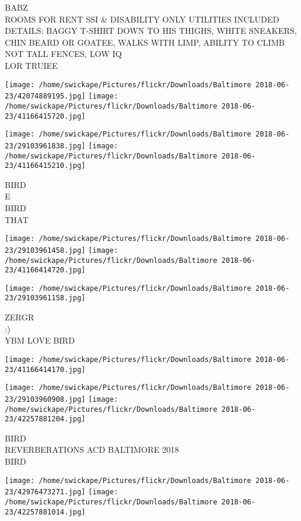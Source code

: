 \documentclass[10pt,letterpaper]{article}
\begin{document}
BABZ\\
ROOMS FOR RENT SSI \& DISABILITY ONLY UTILITIES INCLUDED\\
DETAILS: BAGGY T{-}SHIRT DOWN TO HIS THIGHS, WHITE SNEAKERS, CHIN BEARD OR GOATEE, WALKS WITH LIMP, ABILITY TO CLIMB NOT TALL FENCES, LOW IQ\\
LOR TRUIEE\\
\pagebreak

\texttt{[image: /home/swickape/Pictures/flickr/Downloads/Baltimore 2018-06-23/42074889195.jpg]}
\texttt{[image: /home/swickape/Pictures/flickr/Downloads/Baltimore 2018-06-23/41166415720.jpg]}

\texttt{[image: /home/swickape/Pictures/flickr/Downloads/Baltimore 2018-06-23/29103961838.jpg]}
\texttt{[image: /home/swickape/Pictures/flickr/Downloads/Baltimore 2018-06-23/41166415210.jpg]}

BIRD\\
E\\
BIRD\\
THAT\\
\pagebreak

\texttt{[image: /home/swickape/Pictures/flickr/Downloads/Baltimore 2018-06-23/29103961458.jpg]}
\texttt{[image: /home/swickape/Pictures/flickr/Downloads/Baltimore 2018-06-23/41166414720.jpg]}

\texttt{[image: /home/swickape/Pictures/flickr/Downloads/Baltimore 2018-06-23/29103961158.jpg]}

ZERGR\\
:)\\
YBM LOVE BIRD\\
\pagebreak

\texttt{[image: /home/swickape/Pictures/flickr/Downloads/Baltimore 2018-06-23/41166414170.jpg]}

\vspace{0.25in}
\texttt{[image: /home/swickape/Pictures/flickr/Downloads/Baltimore 2018-06-23/29103960908.jpg]}
\texttt{[image: /home/swickape/Pictures/flickr/Downloads/Baltimore 2018-06-23/42257881204.jpg]}

BIRD\\
REVERBERATIONS ACD BALTIMORE 2018\\
BIRD\\
\pagebreak

\texttt{[image: /home/swickape/Pictures/flickr/Downloads/Baltimore 2018-06-23/42976473271.jpg]}
\texttt{[image: /home/swickape/Pictures/flickr/Downloads/Baltimore 2018-06-23/42257881014.jpg]}
\end{document}
